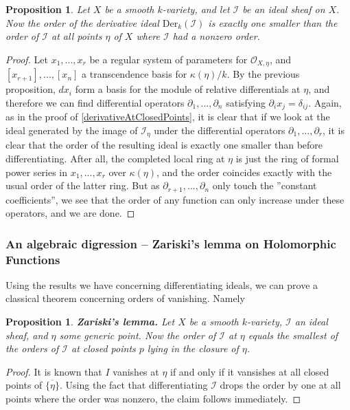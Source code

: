 \documentclass[12pt,a4paper,leqno]{article}
\newcommand{\OO}{\mathcal{O}}
\newcommand{\der}{\mathrm{Der}}
\newcommand{\fref}[1]{\hyperref[{#1}]{\ref*{#1}}}
\theoremstyle{plain}
\newtheorem{prop}[theo]{Proposition}
\theoremstyle{definition}
\theoremstyle{remark}
\begin{document}
\begin{prop}
Let $X$ be a smooth $k$-variety, and let $\mathscr{I}$ be an ideal sheaf on $X$. Now the order of the derivative ideal $\der_k (\mathscr{I})$ is exactly one smaller than the order of $\mathscr{I}$ at all points $\eta$ of $X$ where $\mathscr{I}$ had a nonzero order.
\end{prop}
\begin{proof}
Let $x_1,...,x_r$ be a regular system of parameters for $\OO_{X,\eta}$, and $[x_{r+1}],...,[x_n]$ a transcendence basis for $\kappa(\eta)/k$. By the previous proposition, $dx_i$ form a basis for the module of relative differentials at $\eta$, and therefore we can find differential operators $\partial_1,...,\partial_n$ satisfying $\partial_i x_j = \delta_{ij}$. Again, as in the proof of \fref{derivativeAtClosedPoints}, it is clear that if we look at the ideal generated by the image of $\mathscr{I}_\eta$ under the differential operators $\partial_1,...,\partial_r$, it is clear that the order of the resulting ideal is exactly one smaller than before differentiating. After all, the completed local ring at $\eta$ is just the ring of formal power series in $x_1,...,x_r$ over $\kappa(\eta)$, and the order coincides exactly with the usual order of the latter ring. But as $\partial_{r+1},...,\partial_n$ only touch the ''constant coefficients'', we see that the order of any function can only increase under these operators, and we are done. 
\end{proof}

\subsubsection*{An algebraic digression -- Zariski's lemma on Holomorphic Functions}

Using the results we have concerning differentiating ideals, we can prove a classical theorem concerning orders of vanishing. Namely

\begin{prop}
\textbf{Zariski's lemma.} Let $X$ be a smooth $k$-variety, $\mathscr{I}$ an ideal sheaf, and $\eta$ some generic point. Now the order of $\mathscr{I}$ at $\eta$ equals the smallest of the orders of $\mathscr{I}$ at closed points $p$ lying in the closure of $\eta$. 
\end{prop}
\begin{proof}
It is known that $I$ vanishes at $\eta$ if and only if it vansishes at all closed points of $\overline{\{\eta\}}$. Using the fact that differentiating $\mathscr{I}$ drops the order by one at all points where the order was nonzero, the claim follows immediately.
\end{proof}
\end{document}
